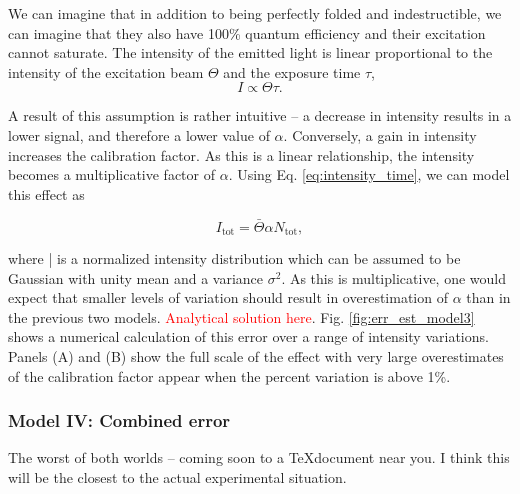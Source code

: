 We can imagine that in addition to being perfectly folded and indestructible, we can imagine that
they also have 100\% quantum efficiency and their excitation cannot saturate. The intensity of the
emitted light is linear proportional to the intensity of the excitation beam $\Theta$ and the
exposure time $\tau$,
\begin{equation}
  I \propto \Theta \tau.
  \label{eq:intensity_time}
\end{equation}

A result of this assumption is rather intuitive -- a decrease in intensity results in a lower signal,
and therefore a lower value of $\alpha$. Conversely, a gain in intensity increases the calibration
factor. As this is a linear relationship, the intensity becomes a multiplicative factor of $\alpha$.
Using Eq. \ref{eq:intensity_time}, we can model this effect as

\begin{equation}
  I_\text{tot} = \bar{\Theta}\alpha N_\text{tot},
\end{equation}

where \bar{\Theta} is a normalized intensity distribution which can be assumed to be Gaussian with
unity mean and a variance $\sigma^2$. As this is multiplicative, one would expect that smaller
levels of variation should result in overestimation of $\alpha$ than in the previous two models.
\textcolor{red}{Analytical solution here}. Fig. \ref{fig:err_est_model3} shows a numerical calculation
of this error over a range of intensity variations. Panels (A) and (B) show the full scale of the
effect with very large overestimates of the calibration factor appear when the percent variation is
above 1\%.

\begin{figure}
\end{figure}

\subsubsection*{Model IV: Combined error}
The worst of both worlds -- coming soon to a \TeX document near you. I think this will be the
closest to the actual experimental situation.
